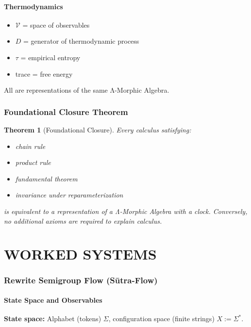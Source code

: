 \documentclass[12pt, oneside]{article}
\newtheorem{theorem}{Theorem}[section]
\begin{document}
\subsection{Thermodynamics}
\begin{itemize}
    \item $\mathcal{V}$ = space of observables
    \item $D$ = generator of thermodynamic process
    \item $\tau$ = empirical entropy
    \item trace = free energy
\end{itemize}

All are representations of the same Λ-Morphic Algebra.

\section{Foundational Closure Theorem}

\begin{theorem}[Foundational Closure]
Every calculus satisfying:
\begin{itemize}
    \item chain rule
    \item product rule
    \item fundamental theorem
    \item invariance under reparameterization
\end{itemize}
is equivalent to a representation of a Λ-Morphic Algebra with a clock. Conversely, no additional axioms are required to explain calculus.
\end{theorem}

\newpage

\part{WORKED SYSTEMS}

\section{Rewrite Semigroup Flow (Sūtra-Flow)}

\subsection{State Space and Observables}

\textbf{State space:} Alphabet (tokens) $\Sigma$, configuration space (finite strings) $X := \Sigma^*$.
\end{document}
